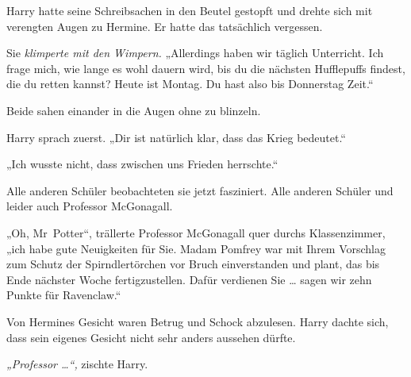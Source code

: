 Harry hatte seine Schreibsachen in den Beutel gestopft und drehte sich mit verengten Augen zu Hermine. Er hatte das tatsächlich vergessen. 

Sie \emph{klimperte mit den Wimpern.} „Allerdings haben wir täglich Unterricht. Ich frage mich, wie lange es wohl dauern wird, bis du die nächsten Hufflepuffs findest, die du retten kannst? Heute ist Montag. Du hast also bis Donnerstag Zeit.“ 

Beide sahen einander in die Augen ohne zu blinzeln. 

Harry sprach zuerst. „Dir ist natürlich klar, dass das Krieg bedeutet.“ 

„Ich wusste nicht, dass zwischen uns Frieden herrschte.“ 

Alle anderen Schüler beobachteten sie jetzt fasziniert. Alle anderen Schüler und leider auch Professor McGonagall. 

„Oh, Mr~Potter“, trällerte Professor McGonagall quer durchs Klassenzimmer, „ich habe gute Neuigkeiten für Sie. Madam Pomfrey war mit Ihrem Vorschlag zum Schutz der Spirndlertörchen vor Bruch einverstanden und plant, das bis Ende nächster Woche fertigzustellen. Dafür verdienen Sie … sagen wir zehn Punkte für Ravenclaw.“ 

Von Hermines Gesicht waren Betrug und Schock abzulesen. Harry dachte sich, dass sein eigenes Gesicht nicht sehr anders aussehen dürfte. 

\emph{„Professor …“,} zischte Harry. 

